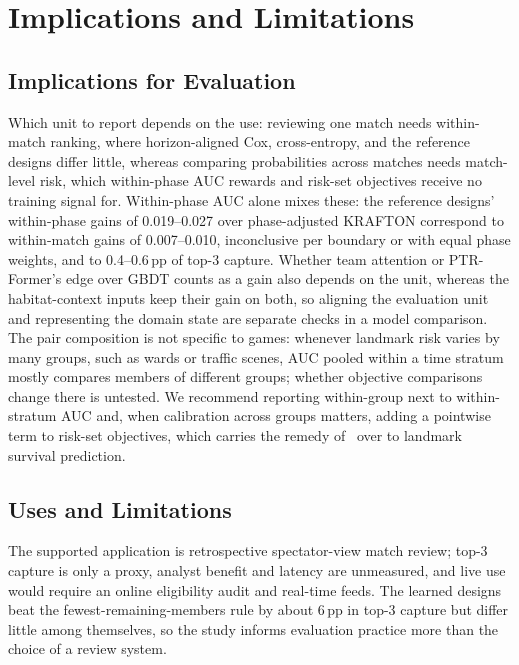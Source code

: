 \documentclass[sigconf,anonymous,nonacm]{acmart}
\begin{document}
\section{Implications and Limitations}
\label{sec:discussion}
\subsection{Implications for Evaluation}
\label{sec:discussion:implications}
Which unit to report depends on the use: reviewing one match needs within-match ranking, where horizon-aligned Cox, cross-entropy, and the reference designs differ little, whereas comparing probabilities across matches needs match-level risk, which within-phase AUC rewards and risk-set objectives receive no training signal for. Within-phase AUC alone mixes these: the reference designs' within-phase gains of 0.019--0.027 over phase-adjusted KRAFTON correspond to within-match gains of 0.007--0.010, inconclusive per boundary or with equal phase weights, and to 0.4--0.6\,pp of top-3 capture. Whether team attention or PTR-Former's edge over GBDT counts as a gain also depends on the unit, whereas the habitat-context inputs keep their gain on both, so aligning the evaluation unit and representing the domain state are separate checks in a model comparison. The pair composition is not specific to games: whenever landmark risk varies by many groups, such as wards or traffic scenes, AUC pooled within a time stratum mostly compares members of different groups; whether objective comparisons change there is untested. We recommend reporting within-group next to within-stratum AUC and, when calibration across groups matters, adding a pointwise term to risk-set objectives, which carries the remedy of~\cite{Bai23} over to landmark survival prediction.

\subsection{Uses and Limitations}
\label{sec:discussion:limits}
The supported application is retrospective spectator-view match review; top-3 capture is only a proxy, analyst benefit and latency are unmeasured, and live use would require an online eligibility audit and real-time feeds. The learned designs beat the fewest-remaining-members rule by about 6\,pp in top-3 capture but differ little among themselves, so the study informs evaluation practice more than the choice of a review system.
\end{document}
